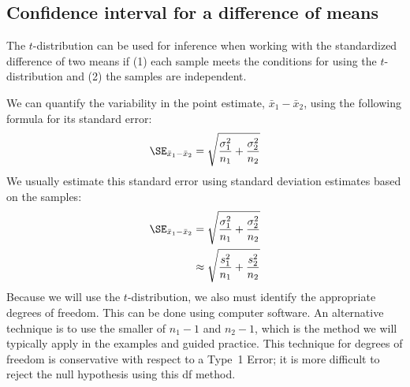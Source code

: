 {

\subsection{Confidence interval for a difference of means}



\begin{termBox}{
\label{ConditionsForTwoSampleTDist}The $t$-distribution can be used for inference when working with the standardized difference of two means if (1) each sample meets the conditions for using the $t$-distribution and (2) the samples are independent.}
\end{termBox}



We can quantify the variability in the point estimate, $\bar{x}_{1} - \bar{x}_{2}$, using the following formula for its standard error:
\begin{eqnarray*}
\SE_{\bar{x}_{1} - \bar{x}_{2}} = \sqrt{\frac{\sigma_{1}^2}{n_{1}} + \frac{\sigma_{2}^2}{n_{2}}}
\end{eqnarray*}
We usually estimate this standard error using standard deviation estimates  based on the samples:
\begin{align*}
\SE_{\bar{x}_{1} - \bar{x}_{2}}
	&= \sqrt{\frac{\sigma_{1}^2}{n_{1}} + \frac{\sigma_{2}^2}{n_{2}}} \\
	&\approx \sqrt{\frac{s_{1}^2}{n_{1}} + \frac{s_{2}^2}{n_{2}}}
\end{align*}
Because we will use the $t$-distribution, we also must identify the appropriate degrees of freedom. This can be done using computer software. An alternative technique is to use the smaller of $n_1 - 1$ and $n_2 - 1$, which is the method we will typically apply in the examples and guided practice. This technique for degrees of freedom is conservative with respect to a Type~1 Error; it is more difficult to reject the null hypothesis using this df method.

}
